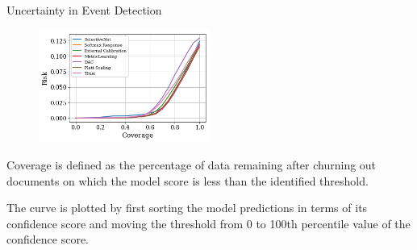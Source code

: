 \begin{frame}{Uncertainty in Event Detection}
\begin{figure}
    \centering
    \includegraphics[width=0.5\textwidth]{Problem2/figures/Calibration_riskCoverage.png}    
\end{figure}
Coverage is defined as the percentage of data remaining after churning out documents on which the model score is less than the identified threshold. 

The curve is plotted by first sorting the model predictions in terms of its confidence score and moving the threshold from 0 to 100th percentile value of the confidence score. 

\end{frame}